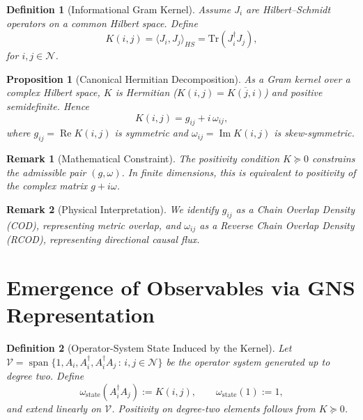 \documentclass[11pt, a4paper]{article}
\newtheorem{definition}{Definition}
\newtheorem{proposition}{Proposition}
\newtheorem{remark}{Remark}
\begin{document}
\begin{definition}[Informational Gram Kernel]
Assume $J_i$ are Hilbert--Schmidt operators on a common Hilbert space. Define
\begin{equation}
    K(i,j) = \langle J_i, J_j \rangle_{HS} = \mathrm{Tr}(J_i^\dagger J_j),
\end{equation}
for $i,j \in \mathcal{N}$.
\end{definition}

\begin{proposition}[Canonical Hermitian Decomposition]
As a Gram kernel over a complex Hilbert space, $K$ is Hermitian ($K(i,j)=\overline{K(j,i)}$) and positive semidefinite. Hence
\begin{equation}
    K(i,j) = g_{ij} + i\,\omega_{ij},
\end{equation}
where $g_{ij}=\operatorname{Re}K(i,j)$ is symmetric and $\omega_{ij}=\operatorname{Im}K(i,j)$ is skew-symmetric.
\end{proposition}

\begin{remark}[Mathematical Constraint]
The positivity condition $K \succeq 0$ constrains the admissible pair $(g,\omega)$. In finite dimensions, this is equivalent to positivity of the complex matrix $g+i\omega$.
\end{remark}

\begin{remark}[Physical Interpretation]
We identify $g_{ij}$ as a Chain Overlap Density (COD), representing metric overlap, and $\omega_{ij}$ as a Reverse Chain Overlap Density (RCOD), representing directional causal flux.
\end{remark}

\section{Emergence of Observables via GNS Representation}

\begin{definition}[Operator-System State Induced by the Kernel]
Let $\mathcal{V}=\operatorname{span}\{1,A_i,A_i^\dagger, A_i^\dagger A_j\,:\, i,j\in\mathcal{N}\}$ be the operator system generated up to degree two. Define
\begin{equation}
\omega_{\mathrm{state}}(A_i^\dagger A_j):=K(i,j), \qquad \omega_{\mathrm{state}}(1):=1,
\end{equation}
and extend linearly on $\mathcal{V}$. Positivity on degree-two elements follows from $K\succeq 0$.
\end{definition}
\end{document}
